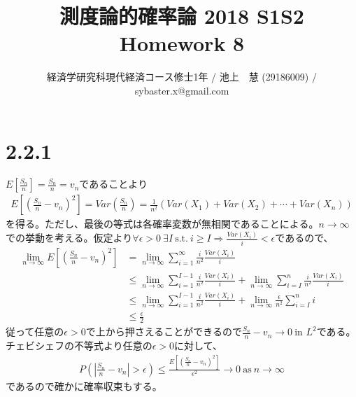 \documentclass{article}
\begin{document}
\title{測度論的確率論 2018 S1S2 \\ 
Homework 8}
\author{経済学研究科現代経済コース修士1年 / 池上　慧 (29186009) / sybaster.x@gmail.com}
\maketitle

\section{2.2.1}
$E\left[ \frac{S_n}{n} \right] = \frac{S_n}{n} = v_n$であることより
\begin{align*}
	E\left[ \left( \frac{S_n}{n} - v_n \right)^2 \right] = Var\left(\frac{S_n}{n}\right) = \frac{1}{n^2} \left( Var(X_1) + Var(X_2) + \cdots + Var(X_n) \right)
\end{align*}
を得る。ただし、最後の等式は各確率変数が無相関であることによる。$n\to \infty$での挙動を考える。仮定より$\forall \epsilon > 0\ \exists I \ \text{s.t.}\ i \geq I \Rightarrow  \frac{Var(X_i)}{i} < \epsilon$であるので、
\begin{align*}
	\lim_{n\to \infty} E\left[ \left( \frac{S_n}{n} - v_n \right)^2 \right] &= \lim_{n\to \infty} \sum_{i=1}^{\infty} \frac{i}{n^2} \frac{Var(X_i)}{i}\\
	&\leq \lim_{n\to \infty} \sum_{i=1}^{I-1}  \frac{i}{n^2} \frac{Var(X_i)}{i} + \lim_{n\to \infty} \sum_{i=I}^{n}  \frac{i}{n^2} \frac{Var(X_i)}{i} \\
	&\leq \lim_{n\to \infty} \sum_{i=1}^{I-1}  \frac{i}{n^2} \frac{Var(X_i)}{i} +  \lim_{n\to \infty} \frac{\epsilon}{n^2} \sum_{i=I}^n i\\
	&\leq \frac{\epsilon}{2}
\end{align*}
従って任意の$\epsilon > 0$で上から押さえることができるので$\frac{S_n}{n} - v_n \to 0\ \text{in $L^2$}$である。チェビシェフの不等式より任意の$\epsilon > 0$に対して、
\begin{align*}
	P\left( \left| \frac{S_n}{n} - v_n \right| > \epsilon \right) \leq \frac{E\left[ \left( \frac{S_n}{n} - v_n \right)^2 \right]}{\epsilon^2} \to 0\ \text{as}\ n\to \infty
\end{align*}
であるので確かに確率収束もする。
\end{document}
